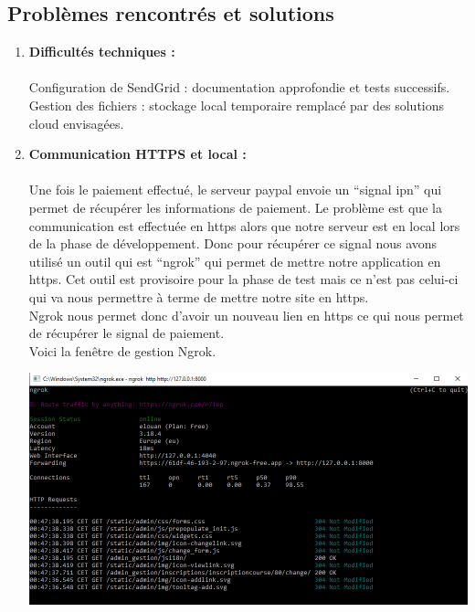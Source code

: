 \documentclass[12pt]{article} %
\begin{document}
	\subsection{Problèmes rencontrés et solutions}
        \begin{enumerate}
            \item \textbf{Difficultés techniques :}\\\\
                Configuration de SendGrid : documentation approfondie et tests successifs.\\
                Gestion des fichiers : stockage local temporaire remplacé par des solutions cloud envisagées.

            \item \textbf{Communication HTTPS et local :}\\\\
                Une fois le paiement effectué, le serveur paypal envoie un “signal ipn” qui permet de récupérer les informations de paiement. Le problème est que la communication est effectuée en https alors que notre serveur est en local lors de la phase de développement. Donc pour récupérer ce signal nous avons utilisé un outil qui est “ngrok” qui permet de mettre notre application en https. Cet outil est provisoire pour la phase de test mais ce n’est pas celui-ci qui va nous permettre à terme de mettre notre site en https.\\
                Ngrok nous permet donc d’avoir un nouveau lien en https ce qui nous permet de récupérer le signal de paiement.\\ Voici la fenêtre de gestion Ngrok.


                \includegraphics[scale=0.6]{images/Capture_M1Ngrok.PNG}

        \end{enumerate}
    
\end{document}
